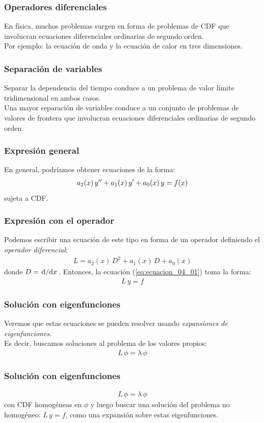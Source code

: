\documentclass[12pt]{beamer}
\begin{document}
\begin{frame}
\frametitle{Operadores diferenciales}
En física, muchos problemas surgen en forma de problemas de CDF que involucran ecuaciones diferenciales ordinarias de segundo orden.
\\
\bigskip
\pause
Por ejemplo: la ecuación de onda y la ecuación de calor en tres dimensiones.
\end{frame}
\begin{frame}
\frametitle{Separación de variables}
Separar la dependencia del tiempo conduce a un problema de valor límite tridimensional en ambos casos.
\\
\bigskip
\pause
Una mayor separación de variables conduce a un conjunto de problemas de valores de frontera que involucran ecuaciones diferenciales ordinarias de segundo orden.
\end{frame}
\begin{frame}
\frametitle{Expresión general}
En general, podríamos obtener ecuaciones de la forma:
\pause
\begin{align}
a_{2} (x) \, {y}^{\prime \prime} + a_{1} (x) \, {y}^{\prime} + a_{0} (x) \, y = f(x)
\label{eq:ecuacion_04_01}
\end{align}
sujeta a CDF.
\end{frame}
\begin{frame}
\frametitle{Expresión con el operador}
Podemos escribir una ecuación de este tipo en forma de un operador definiendo el \emph{operador diferencial}:
\pause
\begin{align*}
L = a_{2} (x) \, D^{2} + a_{1} (x) \, D + a_{0} (x)
\end{align*}
donde $D = \dv*{x}$. \pause Entonces, la ecuación (\ref{eq:ecuacion_04_01}) toma la forma:
\begin{align*}
L \, y = f
\end{align*}
\end{frame}
\begin{frame}
\frametitle{Solución con eigenfunciones}
Veremos que estas ecuaciones se pueden resolver usando \emph{expansiones de eigenfunciones}.
\\
\bigskip
\pause
Es decir, buscamos soluciones al problema de los valores propios:
\pause
\begin{align*}
L \, \phi = \lambda \, \phi
\end{align*}
\end{frame}
\begin{frame}
\frametitle{Solución con eigenfunciones}
\begin{align*}
L \, \phi = \lambda \, \phi
\end{align*}        
con CDF homogéneas en $\phi$ y luego buscar una solución del problema no homogéneo: $L \, y = f$, como una expansión sobre estas eigenfunciones.
\end{frame}
\end{document}
